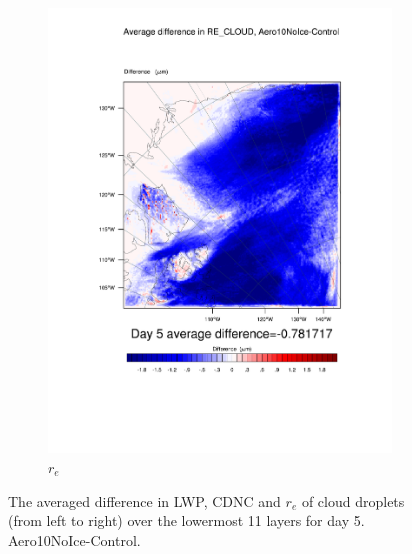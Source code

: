 \begin{figure}[hb]
	\begin{subfigure}{0.40\textwidth}
		\centering
		\includegraphics[width=\textwidth]{results/aero10ni/diff_Aero10NoIce_RE_CLOUD_Day5.pdf}
		\caption{$r_e$}
		\label{subfig:recloudr4Day5}
	\end{subfigure}
\caption{The averaged difference in LWP, CDNC and $r_e$ of cloud droplets (from left to right) over the lowermost 11 layers for day 5. Aero10NoIce-Control.}
\label{fig:lwpcdncre_r4Day5}
\end{figure}

